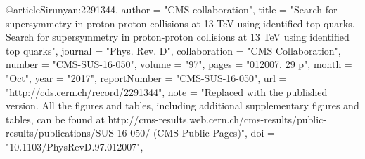 @article{Sirunyan:2291344,
      author        = "{CMS collaboration}",
      title         = "{Search for supersymmetry in proton-proton collisions at
                       13 TeV using identified top quarks. Search for
                       supersymmetry in proton-proton collisions at 13 TeV using
                       identified top quarks}",
      journal       = "Phys. Rev. D",
      collaboration = "CMS Collaboration",
      number        = "CMS-SUS-16-050",
      volume        = "97",
      pages         = "012007. 29 p",
      month         = "Oct",
      year          = "2017",
      reportNumber  = "CMS-SUS-16-050",
      url           = "http://cds.cern.ch/record/2291344",
      note          = "Replaced with the published version. All the figures and
                       tables, including additional supplementary figures and
                       tables, can be found at
                       http://cms-results.web.cern.ch/cms-results/public-results/publications/SUS-16-050/
                       (CMS Public Pages)",
      doi           = "10.1103/PhysRevD.97.012007",
}

